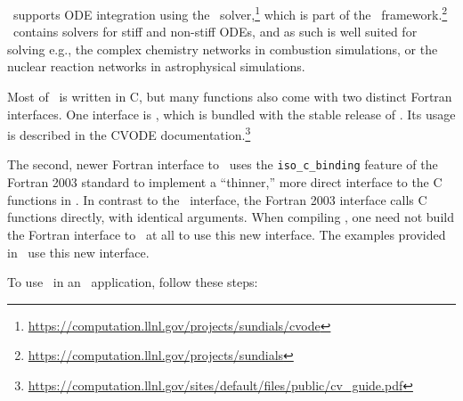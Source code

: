 \amrex\ supports ODE integration using the \cvode\ solver,\footnote{\url{https://computation.llnl.gov/projects/sundials/cvode}} which is part of the \sundials\ framework.\footnote{\url{https://computation.llnl.gov/projects/sundials}}
\cvode\ contains solvers for stiff and non-stiff ODEs, and as such is well suited for solving e.g., the complex chemistry networks in combustion simulations, or the nuclear reaction networks in astrophysical simulations.

Most of \cvode\ is written in C, but many functions also come with two distinct Fortran interfaces.
One interface is \fcvode, which is bundled with the stable release of \cvode.
Its usage is described in the CVODE documentation.\footnote{\url{https://computation.llnl.gov/sites/default/files/public/cv_guide.pdf}}

The second, newer Fortran interface to \cvode\ uses the \texttt{iso\_c\_binding} feature of the Fortran 2003 standard to implement a ``thinner,'' more direct interface to the C functions in \cvode.
In contrast to the \fcvode\ interface, the Fortran 2003 interface calls C functions directly, with identical arguments.
When compiling \cvode, one need not build the Fortran interface to \cvode\ at all to use this new interface.
The examples provided in \amrex\ use this new interface.

To use \cvode\ in an \amrex\ application, follow these steps:


